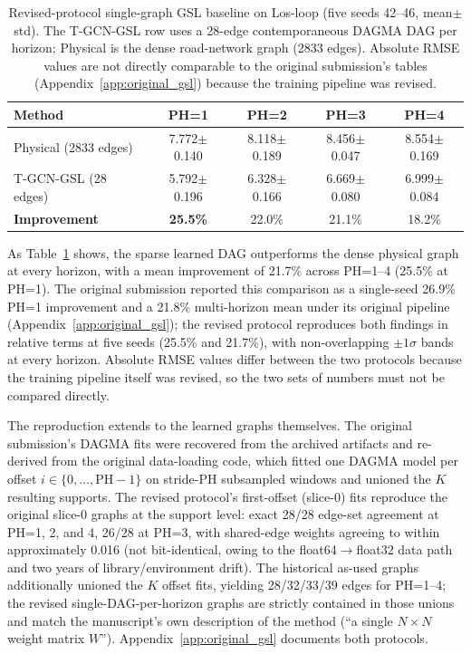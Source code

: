 \begin{table}[t]
\centering
\caption{Revised-protocol single-graph GSL baseline on Los-loop (five seeds 42--46, mean$\pm$std). The T-GCN-GSL row uses a 28-edge contemporaneous DAGMA DAG per horizon; Physical is the dense road-network graph (2833 edges). Absolute RMSE values are not directly comparable to the original submission's tables (Appendix~\ref{app:original_gsl}) because the training pipeline was revised.}
\label{tab:gsl_baseline}
\begin{tabular}{lcccc}
\toprule
\textbf{Method} & \textbf{PH=1} & \textbf{PH=2} & \textbf{PH=3} & \textbf{PH=4} \\
\midrule
Physical (2833 edges) & 7.772$\pm$0.140 & 8.118$\pm$0.189 & 8.456$\pm$0.047 & 8.554$\pm$0.169 \\
T-GCN-GSL (28 edges) & 5.792$\pm$0.196 & 6.328$\pm$0.166 & 6.669$\pm$0.080 & 6.999$\pm$0.084 \\
\midrule
\textbf{Improvement} & \textbf{25.5\%} & 22.0\% & 21.1\% & 18.2\% \\
\bottomrule
\end{tabular}
\end{table}

As Table~\ref{tab:gsl_baseline} shows, the sparse learned DAG outperforms the dense physical graph at every horizon, with a mean improvement of 21.7\% across PH=1--4 (25.5\% at PH=1). The original submission reported this comparison as a single-seed 26.9\% PH=1 improvement and a 21.8\% multi-horizon mean under its original pipeline (Appendix~\ref{app:original_gsl}); the revised protocol reproduces both findings in relative terms at five seeds (25.5\% and 21.7\%), with non-overlapping $\pm 1\sigma$ bands at every horizon. Absolute RMSE values differ between the two protocols because the training pipeline itself was revised, so the two sets of numbers must not be compared directly.

The reproduction extends to the learned graphs themselves. The original submission's DAGMA fits were recovered from the archived artifacts and re-derived from the original data-loading code, which fitted one DAGMA model per offset $i \in \{0, \ldots, \mathrm{PH}{-}1\}$ on stride-$\mathrm{PH}$ subsampled windows and unioned the $K$ resulting supports. The revised protocol's first-offset (slice-0) fits reproduce the original slice-0 graphs at the support level: exact 28/28 edge-set agreement at PH=1, 2, and 4, 26/28 at PH=3, with shared-edge weights agreeing to within approximately 0.016 (not bit-identical, owing to the float64$\rightarrow$float32 data path and two years of library/environment drift). The historical as-used graphs additionally unioned the $K$ offset fits, yielding 28/32/33/39 edges for PH=1--4; the revised single-DAG-per-horizon graphs are strictly contained in those unions and match the manuscript's own description of the method (``a single $N \times N$ weight matrix $W$''). Appendix~\ref{app:original_gsl} documents both protocols.

